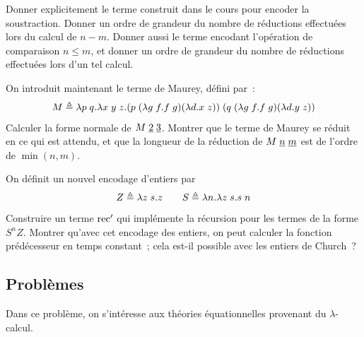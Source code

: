 \begin{exercise}
  Donner explicitement le terme construit dans le cours pour encoder la
  soustraction. Donner un ordre de grandeur du nombre de réductions effectuées
  lors du calcul de $n - m$. Donner aussi le terme encodant l'opération de
  comparaison $n \leq m$, et donner un ordre de grandeur du nombre de réductions
  effectuées lors d'un tel calcul.

  On introduit maintenant le terme de Maurey, défini par~:
  \[M \triangleq \lambda p\;q.\lambda x\;y\;z.
  (p\;(\lambda g\;f.f\;g)(\lambda d.x\;z))\;
  (q\;(\lambda g\;f.f\;g)(\lambda d.y\;z))\]
  Calculer la forme normale de $M\;\underline{2}\;\underline{3}$. Montrer que le
  terme de Maurey se réduit en ce qui est attendu, et que la longueur de la
  réduction de $M\;\underline{n}\;\underline{m}$ est de l'ordre de $\min(n,m)$.
\end{exercise}

\begin{exercise}
  On définit un nouvel encodage d'entiers par
  \[Z \triangleq \lambda z\;s.z\qquad S \triangleq \lambda n.\lambda z\;s.s\;n\]
  Construire un terme $\operatorname{rec}'$ qui implémente la récursion pour les termes de
  la forme $S^n Z$. Montrer qu'avec cet encodage des entiers, on peut calculer
  la fonction prédécesseur en temps constant~; cela est-il possible avec les
  entiers de Church~?
\end{exercise}

\clearpage

\subsection{Problèmes}

\begin{problem}
  Dans ce problème, on s'intéresse aux théories équationnelles provenant du
  $\lambda$-calcul.
\end{problem}
